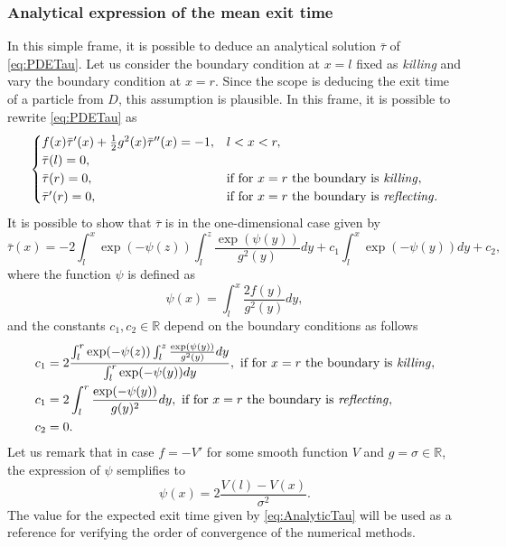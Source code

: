 \subsubsection{Analytical expression of the mean exit time}
In this simple frame, it is possible to deduce an analytical solution $\bar\tau$ of \eqref{eq:PDETau}. Let us consider the boundary condition at $x=l$ fixed as \textit{killing} and vary the boundary condition at $x=r$. Since the scope is deducing the exit time of a particle from $D$, this assumption is plausible. In this frame, it is possible to rewrite \eqref{eq:PDETau} as
\begin{equation}\label{eq:ODETau}
\begin{cases}
	f(x)\bar\tau'(x) + \frac{1}{2} g^2(x) \bar\tau''(x) = -1, & l < x < r, \\
	\bar\tau(l) = 0, \\
	\bar\tau(r) = 0, & \text{if for $x = r$ the boundary is \textit{killing}}, \\
	\bar\tau'(r) = 0, & \text{if for $x = r$ the boundary is \textit{reflecting}}. 
\end{cases}
\end{equation}
It is possible to show \cite{Krumscheid2015,Pavliotis2014} that $\bar\tau$ is in the one-dimensional case given by
\begin{equation}\label{eq:AnalyticTau}
	\bar\tau(x) = -2 \int_l^x \exp(-\psi(z)) \int_l^z \frac{\exp(\psi(y))}{g^2(y)}dy + c_1 \int_l^x \exp(-\psi(y))dy + c_2,
\end{equation}
where the function $\psi$ is defined as
\begin{equation}\label{eq:psi}
	\psi(x) = \int_l^x \frac{2f(y)}{g^2(y)}dy,
\end{equation}
and the constants $c_1,c_2 \in \mathbb{R}$ depend on the boundary conditions as follows
\begin{align}\label{eq:Constants}
\begin{split}
	c_1 &= 2\frac{\int_l^r \exp(-\psi(z)) \int_l^z \frac{\exp(\psi(y))}{g^2(y)}dy}{\int_l^r \exp(-\psi(y))dy}, \text{  if for $x = r$ the boundary is \textit{killing}}, \\
	c_1 &= 2\int_l^r \frac{\exp(-\psi(y))}{g(y)^2}dy, \text{  if for $x = r$ the boundary is \textit{reflecting}}, \\
	c_2 &= 0.
\end{split}
\end{align}
Let us remark that in case $f = -V'$ for some smooth function $V$ and $g = \sigma \in \mathbb{R}$, the expression of $\psi$ semplifies to
\begin{equation}\label{eq:psiSemplified}
	\psi(x) = 2\frac{V(l)-V(x)}{\sigma^2}.
\end{equation}
The value for the expected exit time given by \eqref{eq:AnalyticTau} will be used as a reference for verifying the order of convergence of the numerical methods.
